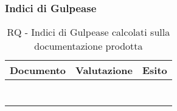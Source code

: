 \documentclass[../PianoDiQualifica.tex]{subfiles}
\begin{document}
				\subsubsection{Indici di Gulpease}
					\begin{table}[H]
					\center
						\begin{tabular}{|l|c|c|}
							\hline
							\rowcolor{blue!30}\textbf{Documento} & \textbf{Valutazione} & \textbf{Esito} \\ \hline
							\analisideirequisitiRQ &  &  \\ \hline
							\glossarioRQ &  &  \\ \hline
							\normediprogettoRQ &  &  \\ \hline
							\pianodiprogettoRQ &  &  \\ \hline
							\pianodiqualificaRQ &  &  \\ \hline
							\specificatecnicaRQ &  &  \\ \hline
							 &  &  \\ \hline
						\end{tabular}
					\caption{RQ - Indici di Gulpease calcolati sulla documentazione prodotta}
					\end{table}
\end{document}
